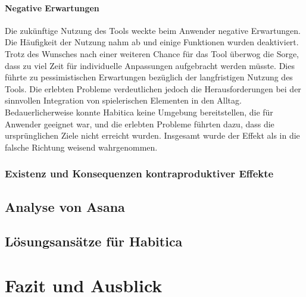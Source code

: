 \documentclass[sigconf, nonacm]{acmart}
\begin{document}
\paragraph{Negative Erwartungen}\label{sec:sr3}
Die zukünftige Nutzung des Tools weckte beim Anwender negative Erwartungen. Die Häufigkeit der Nutzung nahm ab und einige Funktionen wurden deaktiviert. Trotz des Wunsches nach einer weiteren Chance für das Tool überwog die Sorge, dass zu viel Zeit für individuelle Anpassungen aufgebracht werden müsste. Dies führte zu pessimistischen Erwartungen bezüglich der langfristigen Nutzung des Tools. Die erlebten Probleme verdeutlichen jedoch die Herausforderungen bei der sinnvollen Integration von spielerischen Elementen in den Alltag. Bedauerlicherweise konnte Habitica keine Umgebung bereitstellen, die für Anwender geeignet war, und die erlebten Probleme führten dazu, dass die ursprünglichen Ziele nicht erreicht wurden. Insgesamt wurde der Effekt als in die falsche Richtung weisend wahrgenommen.

\subsubsection{Existenz und Konsequenzen kontraproduktiver Effekte}

\subsection{Analyse von Asana}

\subsection{Lösungsansätze für Habitica}\label{sec:solutions_for_habitica}

\section{Fazit und Ausblick}




\end{document}
